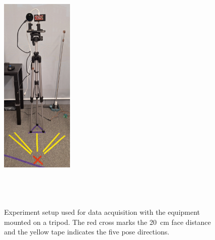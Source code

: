 \documentclass{mpaper}
\begin{document}
\begin{figure}[t]
    \centering
    \vspace{-0.42cm}
    \includegraphics[width=0.31\textwidth, height=12.5cm]{figures/experiment_setup.pdf}
    \vspace{0.2cm}
    \caption{Experiment setup used for data acquisition with the equipment mounted on a tripod. The red cross marks the \qty{20}{\cm} face distance and the yellow tape indicates the five pose directions.}
    \label{fig:experiment_setup}
    \vspace{-0.7cm}
\end{figure}


\begin{table}[b!]
    \centering
    \vspace{-0.3cm}
    \vspace{0.1cm}
    \caption{Table displaying the full forms of common abbreviations describing the experiment conditions}
    \label{tab:abbreviated_conditions}
    \vspace{-0.5cm}
\end{table}
\end{document}
